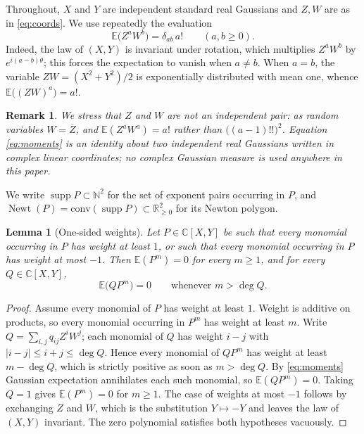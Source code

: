 \documentclass[10pt,a4paper]{amsart}
\newtheorem{lemma}[theorem]{Lemma}
\newtheorem{remark}[theorem]{Remark}
\numberwithin{equation}{section}
\DeclareMathOperator{\Newt}{Newt}
\DeclareMathOperator{\supp}{supp}
\newcommand{\C}{\mathbb{C}}
\newcommand{\N}{\mathbb{N}}
\newcommand{\E}{\mathbb{E}}
\begin{document}
Throughout, $X$ and $Y$ are independent standard real Gaussians and $Z,W$ are as
in \eqref{eq:coords}. We use repeatedly the evaluation
\begin{equation}\label{eq:moments}
  \E\bigl(Z^aW^b\bigr)=\delta_{ab}\,a! \qquad (a,b\ge0).
\end{equation}
Indeed, the law of $(X,Y)$ is invariant under rotation, which multiplies
$Z^aW^b$ by $e^{i(a-b)\theta}$; this forces the expectation to vanish when
$a\ne b$. When $a=b$, the variable $ZW=(X^2+Y^2)/2$ is exponentially
distributed with mean one, whence $\E\bigl((ZW)^a\bigr)=a!$.

\begin{remark}
We stress that $Z$ and $W$ are \emph{not} an independent pair: as random
variables $W=\overline Z$, and $\E(Z^aW^a)=a!$ rather than
$\bigl((a-1)!!\bigr)^2$. Equation \eqref{eq:moments} is an identity about two
independent \emph{real} Gaussians written in complex linear coordinates; no
complex Gaussian measure is used anywhere in this paper.
\end{remark}

We write $\supp P\subset\N^2$ for the set of exponent pairs occurring in $P$,
and $\Newt(P)=\mathrm{conv}(\supp P)\subset\mathbb R_{\ge0}^2$ for its Newton
polygon.

\begin{lemma}[One-sided weights]\label{lem:weights}
Let $P\in\C[X,Y]$ be such that every monomial occurring in $P$ has weight at
least $1$, or such that every monomial occurring in $P$ has weight at most
$-1$. Then $\E(P^m)=0$ for every $m\ge1$, and for every $Q\in\C[X,Y]$,
\[
  \E\bigl(QP^m\bigr)=0 \qquad\text{whenever } m>\deg Q .
\]
\end{lemma}

\begin{proof}
Assume every monomial of $P$ has weight at least $1$. Weight is additive on
products, so every monomial occurring in $P^m$ has weight at least $m$. Write
$Q=\sum_{i,j}q_{ij}Z^iW^j$; each monomial of $Q$ has weight $i-j$ with
$|i-j|\le i+j\le\deg Q$. Hence every monomial of $QP^m$ has weight at least
$m-\deg Q$, which is strictly positive as soon as $m>\deg Q$. By
\eqref{eq:moments} Gaussian expectation annihilates each such monomial, so
$\E(QP^m)=0$. Taking $Q=1$ gives $\E(P^m)=0$ for $m\ge1$. The case of weights at
most $-1$ follows by exchanging $Z$ and $W$, which is the substitution
$Y\mapsto-Y$ and leaves the law of $(X,Y)$ invariant. The zero polynomial
satisfies both hypotheses vacuously.
\end{proof}
\end{document}

